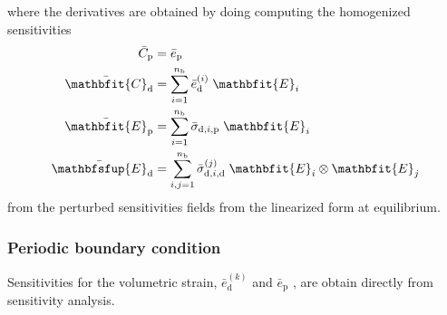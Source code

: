 \documentclass[12pt,a4paper]{article}
\renewcommand{\ts}[1]{\mathbfit{#1}}
\renewcommand{\tf}[1]{\mathbfsfup{#1}}
\renewcommand{\dev}{\mathrm{d}}
\newcommand{\ded}{\mathrm{d}}
\newcommand{\dep}{\mathrm{p}}
\begin{document}
where the derivatives are obtained by doing computing the homogenized sensitivities
\begin{align}
 \bar{    C}_\dep &= \bar{e}_{\dep}\\
 \bar{\ts C}_\ded &= \sum_{i=1}^{n_\mathrm{b}} \bar{e}_{\ded}^{(i)}\;\ts E_i\\
 \bar{\ts E}_\dep &= \sum_{i=1}^{n_\mathrm{b}} \bar{\sigma}_{\dev,i,\dep}\;\ts E_i\\
 \bar{\tf E}_\ded &= \sum_{i,j=1}^{n_\mathrm{b}} \bar{\sigma}_{\dev,i,\ded}^{(j)}\;\ts E_i \outerp \ts E_j
\end{align}
from the perturbed sensitivities fields from the linearized form at equilibrium.

\newpage
\subsubsection{Periodic boundary condition}
Sensitivities for the volumetric strain, $\bar{e}_\ded^{(k)}$ and $\bar{e}_\dep$ , are obtain directly from sensitivity analysis.
\end{document}

